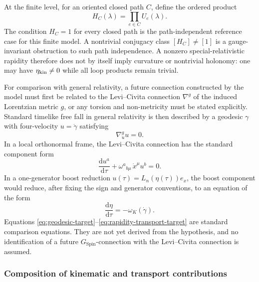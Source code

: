 \documentclass[11pt,a4paper]{article}
\theoremstyle{remark}
\newcommand{\SpinG}{G_{\mathrm{Spin}}}
\newcommand{\dd}{\mathrm d}
\begin{document}
At the finite level, for an oriented closed path \(C\), define the ordered product
\begin{equation}
  H_C(\lambda)=\prod_{e\in C}U_e(\lambda).
\tag{3.14}\label{eq:finite-loop-product}
\end{equation}
The condition \(H_C=1\) for every closed path is the path-independent reference case for this finite model.  A nontrivial conjugacy class \([H_C]\neq[1]\) is a gauge-invariant obstruction to such path independence.  A nonzero special-relativistic rapidity therefore does not by itself imply curvature or nontrivial holonomy: one may have \(\eta_{\rm kin}\neq0\) while all loop products remain trivial.

For comparison with general relativity, a future connection constructed by the model must first be related to the Levi--Civita connection \(\nabla^g\) of the induced Lorentzian metric \(g\), or any torsion and non-metricity must be stated explicitly.  Standard timelike free fall in general relativity is then described by a geodesic \(\gamma\) with four-velocity \(u=\dot\gamma\) satisfying
\begin{equation}
  \nabla^g_u u=0.
\tag{3.15}\label{eq:geodesic-target}
\end{equation}
In a local orthonormal frame, the Levi--Civita connection has the standard component form
\begin{equation}
  \frac{\dd u^a}{\dd\tau}
  +\omega^a{}_{b\mu}\,\dot x^\mu u^b=0.
\tag{3.16}\label{eq:frame-parallel-target}
\end{equation}
In a one-generator boost reduction \(u(\tau)=L_n(\eta(\tau))e_x\), the boost component would reduce, after fixing the sign and generator conventions, to an equation of the form
\begin{equation}
  \frac{\dd\eta}{\dd\tau}
  =-\omega_K(\dot\gamma).
\tag{3.17}\label{eq:rapidity-transport-target}
\end{equation}
Equations \eqref{eq:geodesic-target}--\eqref{eq:rapidity-transport-target} are standard comparison equations.  They are not yet derived from the hypothesis, and no identification of a future \(\SpinG\)-connection with the Levi--Civita connection is assumed.

\subsubsection*{Composition of kinematic and transport contributions}
\end{document}
